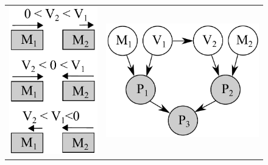 \documentclass{article}
\begin{document}
\begin{figure}[t!]
\vspace{-3mm}
\begin{center}
\begin{tabular}{cc}
   \hspace{-0mm} \includegraphics[width=\linewidth/6]{Figs/little-momentum0.pdf} 
& \hspace{6mm} \includegraphics[width=0.35\linewidth]{Figs/little-momentum1.pdf} 

\end{tabular}
\end{center}
\end{figure}
\end{document}
